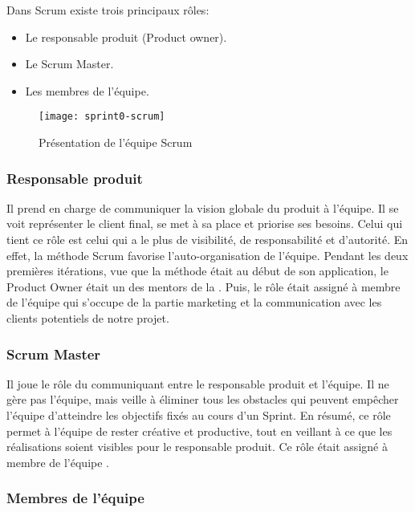 Dans Scrum existe trois principaux rôles:

\begin{itemize}
    \item Le responsable produit (Product owner).
    \item Le Scrum Master.
    \item Les membres de l'équipe.
\end{itemize}

\begin{figure}[!h]
    \centering
    \texttt{[image: sprint0-scrum]}
    \caption{Présentation de l'équipe Scrum}
    \label{fig:sprint0-scrum}
\end{figure}

\subsubsection{Responsable produit }

Il prend en charge de communiquer la vision globale du produit à l'équipe. Il
se voit représenter le client final, se met à sa place et priorise ses besoins.
Celui qui tient ce rôle est celui qui a le plus de visibilité, de
responsabilité et d'autorité. En effet, la méthode Scrum favorise
l'auto-organisation de l'équipe. Pendant les deux premières itérations, vue que
la méthode était au début de son application, le Product Owner était un des
mentors de la . Puis, le rôle était assigné à membre
de l'équipe qui s'occupe de la partie marketing et la communication avec les
clients potentiels de notre projet.

\subsubsection{Scrum Master}

Il joue le rôle du communiquant entre le responsable produit et l'équipe. Il ne
gère pas l'équipe, mais veille à éliminer tous les obstacles qui peuvent
empêcher l'équipe d'atteindre les objectifs fixés au cours d'un Sprint. En
résumé, ce rôle permet à l'équipe de rester créative et productive, tout en
veillant à ce que les réalisations soient visibles pour le responsable produit.
Ce rôle était assigné à membre de l'équipe .

\subsubsection{Membres de l'équipe}

